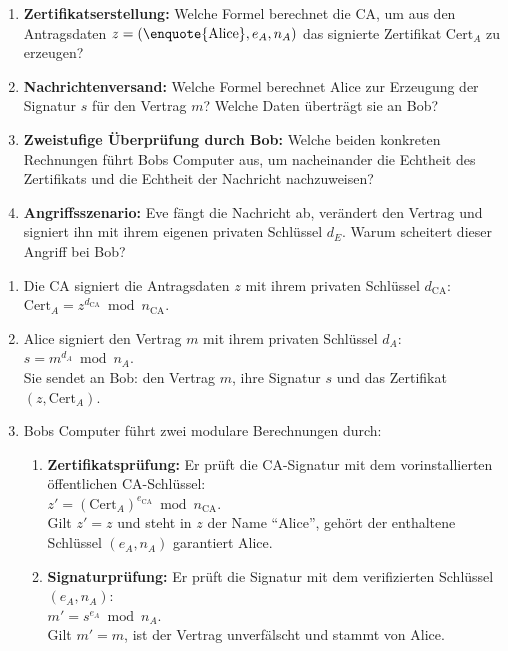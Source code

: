 \begin{myexercise}
	\begin{enumerate}
		\item \textbf{Zertifikatserstellung:} Welche Formel berechnet die \gls{CA}, um aus den Antragsdaten $z = (\text{\enquote{Alice}}, e_A, n_A)$ das signierte Zertifikat $\text{Cert}_A$ zu erzeugen?
		\item \textbf{Nachrichtenversand:} Welche Formel berechnet Alice zur Erzeugung der Signatur $s$ für den Vertrag $m$? Welche Daten überträgt sie an Bob?
		\item \textbf{Zweistufige Überprüfung durch Bob:} Welche beiden konkreten Rechnungen führt Bobs Computer aus, um nacheinander die Echtheit des Zertifikats und die Echtheit der Nachricht nachzuweisen?
		\item \textbf{Angriffsszenario:} Eve fängt die Nachricht ab, verändert den Vertrag und signiert ihn mit ihrem eigenen privaten Schlüssel $d_E$. Warum scheitert dieser Angriff bei Bob?
	\end{enumerate}
	\begin{myanswer}
		\begin{enumerate}
			\item Die \gls{CA} signiert die Antragsdaten $z$ mit ihrem privaten Schlüssel $d_{\text{CA}}$:\\
			      $\text{Cert}_A = z^{d_{\text{CA}}} \bmod n_{\text{CA}}$.
			\item Alice signiert den Vertrag $m$ mit ihrem privaten Schlüssel $d_A$:\\
			      $s = m^{d_A} \bmod n_A$.\\
			      Sie sendet an Bob: den Vertrag $m$, ihre Signatur $s$ und das Zertifikat $(z, \text{Cert}_A)$.
			\item Bobs Computer führt zwei modulare Berechnungen durch:
			      \begin{enumerate}
				      \item \textbf{Zertifikatsprüfung:} Er prüft die \gls{CA}-Signatur mit dem vorinstallierten öffentlichen \gls{CA}-Schlüssel:\\
				            $z' = (\text{Cert}_A)^{e_{\text{CA}}} \bmod n_{\text{CA}}$.\\
				            Gilt $z' = z$ und steht in $z$ der Name \enquote{Alice}, gehört der enthaltene Schlüssel $(e_A, n_A)$ garantiert Alice.
				      \item \textbf{Signaturprüfung:} Er prüft die Signatur mit dem verifizierten Schlüssel $(e_A, n_A)$:\\
				            $m' = s^{e_A} \bmod n_A$.\\
				            Gilt $m' = m$, ist der Vertrag unverfälscht und stammt von Alice.


\end{enumerate}
\end{enumerate}
\end{myanswer}
\end{myexercise}
